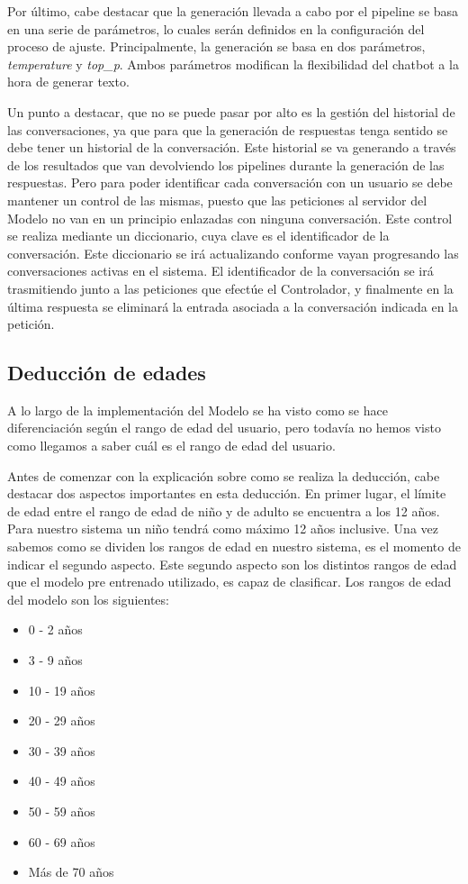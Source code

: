 Por último, cabe destacar que la generación llevada a cabo por el pipeline se basa en una serie de parámetros, lo cuales serán definidos en la configuración del proceso de ajuste. Principalmente, la generación se basa en dos parámetros, \textit{temperature} y \textit{top\_p}. Ambos parámetros modifican la flexibilidad del chatbot a la hora de generar texto.

Un punto a destacar, que no se puede pasar por alto es la gestión del historial de las conversaciones, ya que para que la generación de respuestas tenga sentido se debe tener un historial de la conversación. Este historial se va generando a través de los resultados que van devolviendo los pipelines durante la generación de las respuestas. Pero para poder identificar cada conversación con un usuario se debe mantener un control de las mismas, puesto que las peticiones al servidor del Modelo no van en un principio enlazadas con ninguna conversación. Este control se realiza mediante un diccionario, cuya clave es el identificador de la conversación. Este diccionario se irá actualizando conforme vayan progresando las conversaciones activas en el sistema. El identificador de la conversación se irá trasmitiendo junto a las peticiones que efectúe el Controlador, y finalmente en la última respuesta se eliminará la entrada asociada a la conversación indicada en la petición.

\subsection{Deducción de edades}

A lo largo de la implementación del Modelo se ha visto como se hace diferenciación según el rango de edad del usuario, pero todavía no hemos visto como llegamos a saber cuál es el rango de edad del usuario.

Antes de comenzar con la explicación sobre como se realiza la deducción, cabe destacar dos aspectos importantes en esta deducción. En primer lugar, el límite de edad entre el rango de edad de niño y de adulto se encuentra a los 12 años. Para nuestro sistema un niño tendrá como máximo 12 años inclusive. Una vez sabemos como se dividen los rangos de edad en nuestro sistema, es el momento de indicar el segundo aspecto. Este segundo aspecto son los distintos rangos de edad que el modelo pre entrenado utilizado, es capaz de clasificar. Los rangos de edad del modelo son los siguientes:

\begin{itemize}
\item 0 - 2 años
\item 3 - 9 años
\item 10 - 19 años
\item 20 - 29 años
\item 30 - 39 años
\item 40 - 49 años
\item 50 - 59 años
\item 60 - 69 años
\item Más de 70 años
\end{itemize}

